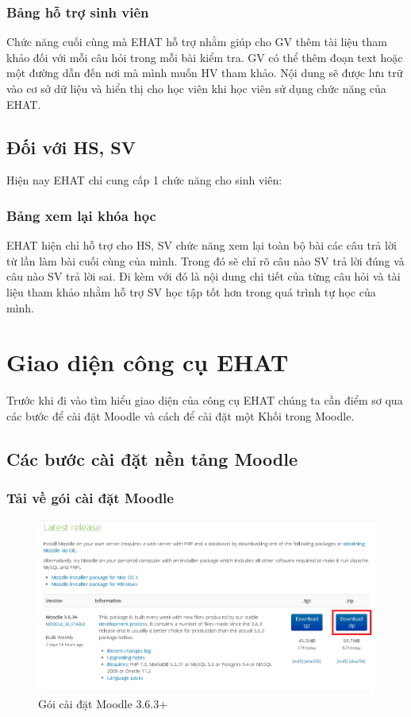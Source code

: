 \subsubsection{Bảng hỗ trợ sinh viên}
Chức năng cuối cùng mà EHAT hỗ trợ nhằm giúp cho GV thêm tài liệu tham khảo đối với mỗi câu hỏi trong mỗi bài kiểm tra. GV có thể thêm đoạn text hoặc một đường dẫn đến nơi mà mình muốn HV tham khảo. Nội dung sẽ được lưu trữ vào cơ sở dữ liệu và hiển thị cho học viên khi học viên sử dụng chức năng của EHAT.

\newpage
\subsection{Đối với HS, SV}

Hiện nay EHAT chỉ cung cấp 1 chức năng cho sinh viên:

\subsubsection{Bảng xem lại khóa học}
EHAT hiện chỉ hỗ trợ cho HS, SV chức năng xem lại toàn bộ bài các câu trả lời từ lần làm bài cuối cùng của mình. Trong đó sẽ chỉ rõ câu nào SV trả lời đúng và câu nào SV trả lời sai. Đi kèm với đó là nội dung chi tiết của từng câu hỏi và tài liệu tham khảo nhằm hỗ trợ SV học tập tốt hơn trong quá trình tự học của mình.

\section{Giao diện công cụ EHAT}

Trước khi đi vào tìm hiểu giao diện của công cụ EHAT chúng ta cần điểm sơ qua các bước để cài đặt Moodle và cách để cài đặt một Khối trong Moodle.

\subsection{Các bước cài đặt nền tảng Moodle}

\subsubsection{Tải về gói cài đặt Moodle}

\begin{center}
	\begin{figure}[htp]
		\begin{center}
			\includegraphics[width=0.8\linewidth]{img/packagemoodle}
		\end{center}
		\caption{Gói cài đặt Moodle 3.6.3+}
		\label{refhinh28}
	\end{figure}
\end{center}

